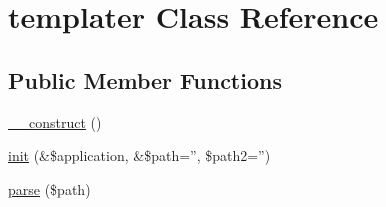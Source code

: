 \hypertarget{classtemplater}{
\section{templater Class Reference}
\label{classtemplater}
}
\subsection*{Public Member Functions}
\begin{DoxyCompactItemize}
\item 
\hyperlink{classtemplater_a095c5d389db211932136b53f25f39685}{\_\-\_\-construct} ()
\item 
\hyperlink{classtemplater_a4b200fdf13aa91e11ac17bb13ff998d2}{init} (\&\$application, \&\$path='', \$path2='')
\item 
\hyperlink{classtemplater_a16cb512b453ef9d52c8632f9ffb2b70f}{parse} (\$path)
\end{DoxyCompactItemize}
